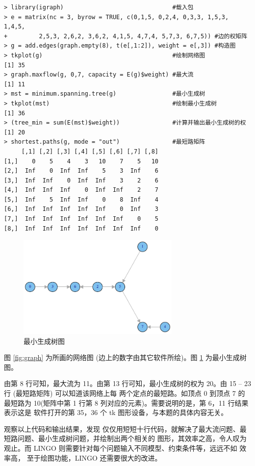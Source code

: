 \begin{Verbatim}
> library(igraph)                               #载入包
> e = matrix(nc = 3, byrow = TRUE, c(0,1,5, 0,2,4, 0,3,3, 1,5,3, 1,4,5,
+         2,5,3, 2,6,2, 3,6,2, 4,1,5, 4,7,4, 5,7,3, 6,7,5)) #边的权矩阵
> g = add.edges(graph.empty(8), t(e[,1:2]), weight = e[,3]) #构造图
> tkplot(g)                                     #绘制网络图
[1] 35
> graph.maxflow(g, 0,7, capacity = E(g)$weight) #最大流
[1] 11
> mst = minimum.spanning.tree(g)                #最小生成树
> tkplot(mst)                                   #绘制最小生成树
[1] 36
> (tree_min = sum(E(mst)$weight))               #计算并输出最小生成树的权
[1] 20
> shortest.paths(g, mode = "out")               #最短路矩阵
     [,1] [,2] [,3] [,4] [,5] [,6] [,7] [,8]
[1,]    0    5    4    3   10    7    5   10
[2,]  Inf    0  Inf  Inf    5    3  Inf    6
[3,]  Inf  Inf    0  Inf  Inf    3    2    6
[4,]  Inf  Inf  Inf    0  Inf  Inf    2    7
[5,]  Inf    5  Inf  Inf    0    8  Inf    4
[6,]  Inf  Inf  Inf  Inf  Inf    0  Inf    3
[7,]  Inf  Inf  Inf  Inf  Inf  Inf    0    5
[8,]  Inf  Inf  Inf  Inf  Inf  Inf  Inf    0
\end{Verbatim}
\begin{figure}[h]
\centering
\includegraphics[width=8cm]{./pic/tree.pdf}
\caption{最小生成树图}\label{fig:tree}
\end{figure}

图 \ref{fig:graph} 为所画的网络图 (边上的数字由其它软件所绘)。图 \ref{fig:tree} 为最小生成树图。


由第 8 行可知，最大流为 11。由第 13 行可知，最小生成树的权为 20。由 15 -- 23 行 (最短路矩阵) 可以知道该网络上每
两个定点的最短路。如顶点 0 到顶点 7 的最短路为 10(矩阵中第 1 行第 8 列对应的元素)。需要说明的是，第 6，11 行结果
表示这是 \R 软件打开的第 35，36 个 tk 图形设备，与本题的具体内容无关。


观察以上代码和输出结果，发现 \R 仅仅用短短十行代码，就解决了最大流问题、最短路问题、最小生成树问题，并绘制出两个相关的
图形，其效率之高，令人叹为观止。而 LINGO 则需要针对每个问题输入不同模型、约束条件等，远远不如 \R 效率高，
至于绘图功能，LINGO 还需要很大的改进。
